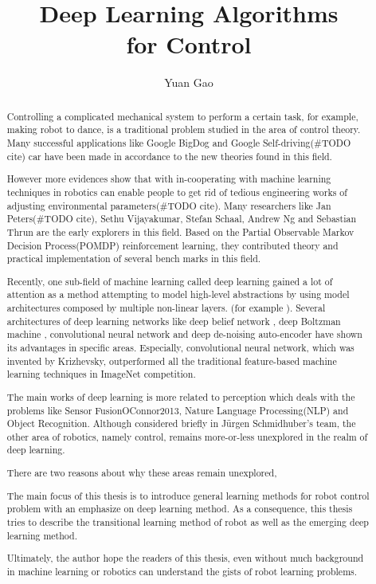 \documentclass[officiallayout]{tktla}
\title{Deep Learning Algorithms \\ for Control}
\author{Yuan Gao}
\begin{document}
\frontmatter

\maketitle

\begin{abstract}
Controlling a complicated mechanical system to perform a certain task, for example, making robot to dance, is a traditional problem studied in the area of control theory. Many successful applications like Google BigDog\cite{Raibert2008} and Google Self-driving(#TODO cite) car have been made in accordance to the new theories found in this field.

However more evidences show that with in-cooperating with machine learning techniques in robotics can enable people to get rid of tedious engineering works of adjusting environmental parameters(#TODO cite). Many researchers like Jan Peters(#TODO cite), Sethu Vijayakumar, Stefan Schaal, Andrew Ng and Sebastian Thrun are the early explorers in this field. Based on the Partial Observable Markov Decision Process(POMDP) reinforcement learning, they contributed theory and practical implementation of several bench marks in this field.

Recently, one sub-field of machine learning called deep learning gained a lot of attention as a method attempting to model high-level abstractions by using model architectures composed by multiple non-linear layers. (for example \cite{Krizhevsky2012}). Several architectures of deep learning networks like deep belief network \cite{Hinton2006}, deep Boltzman machine \cite{Salakhutdinov2009}, convolutional neural network \cite{Krizhevsky2012} and deep de-noising auto-encoder \cite{Vincent2010} have shown its advantages in specific areas. Especially, convolutional neural network, which was invented by Krizhevsky, outperformed all the traditional feature-based machine learning techniques in ImageNet competition.

The main works of deep learning is more related to perception which deals with the problems like Sensor Fusion{OConnor2013}, Nature Language Processing(NLP)\cite{Cho2014} and Object Recognition\cite{Lenz2013}\cite{Hoffman2014}. Although considered briefly in Jürgen Schmidhuber's team\cite{Mayer2006}, the other area of robotics, namely control, remains more-or-less unexplored in the realm of deep learning.

There are two reasons about why these areas remain unexplored,

The main focus of this thesis is to introduce general learning methods for robot control problem with an emphasize on deep learning method. As a consequence, this thesis tries to describe the transitional learning method of robot as well as the emerging deep learning method.

Ultimately, the author hope the readers of this thesis, even without much background in machine learning or robotics can understand the gists of robot learning problems.
\end{abstract}
\end{document}
